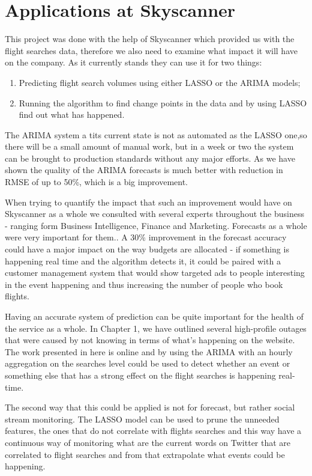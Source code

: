 \documentclass[minf,twoside,singlespacing,parskip,frontabs,notimes,12pt]{infthesis} %
\begin{document}
\section{Applications at Skyscanner}

This project was done with the help of Skyscanner which provided us with the flight searches data, therefore we also need to examine what impact it will have on the company. As it currently stands they can use it for two things:
\begin{enumerate}
\item Predicting flight search volumes using either LASSO or the ARIMA models;
\item Running the algorithm to find change points in the data and by using LASSO find out what has happened.
\end{enumerate}

The ARIMA system a tits current state is not as automated as the LASSO one,so there will be a small amount of manual work, but in a week or two the system can be brought to production standards without any major efforts. As we have shown the quality of the ARIMA forecasts is much better with reduction in RMSE of up to 50\%, which is a big improvement.

When trying to quantify the impact that such an improvement would have on Skyscanner as a whole we consulted with several experts throughout the business - ranging form Business Intelligence, Finance and Marketing. Forecasts as a whole were very important for them.. A 30\% improvement in the forecast accuracy could have a major impact on the way budgets are allocated - if something is happening real time and the algorithm detects it, it could be paired with a customer management system that would show targeted ads to people interesting in the event happening and thus increasing the number of people who book flights.

Having an accurate system of prediction can be quite important for the health of the service as a whole. In Chapter 1, we have outlined several high-profile outages that were caused by not knowing in terms of what's happening on the website. The work presented in here is online and by using the ARIMA with an hourly aggregation on the searches level could be used to detect whether an event or something else that has a strong effect on the flight searches is happening real-time. 

The second way that this could be applied is not for forecast, but rather social stream monitoring. The LASSO model can be used to prune the unneeded features, the ones that do not correlate with flights searches and this way have a continuous way of monitoring what are the current words on Twitter that are correlated to flight searches and from that extrapolate what events could be happening.
\end{document}
